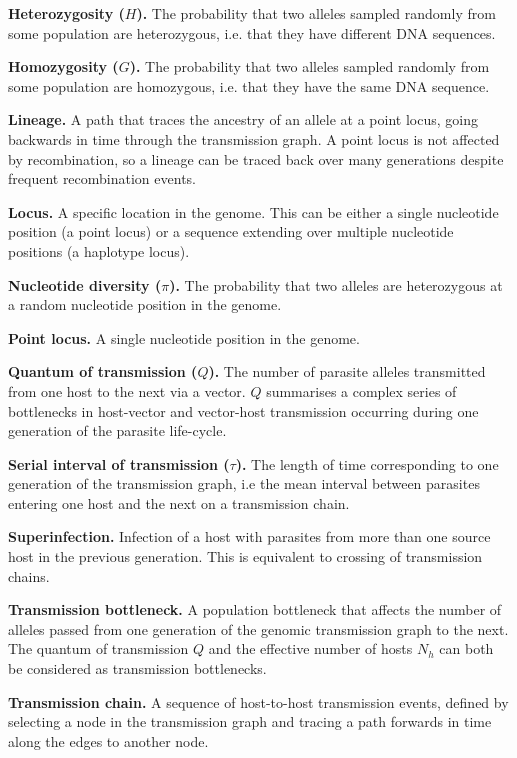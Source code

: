 \documentclass[_main.tex]{subfiles}
\begin{document}
{{\textbf{Heterozygosity ($H$).}  The probability that two alleles sampled randomly from some population are heterozygous, i.e. that they have different DNA sequences. 

\medskip

\textbf{Homozygosity ($G$).}  The probability that two alleles sampled randomly from some population are homozygous, i.e. that they have the same DNA sequence.

\medskip

\textbf{Lineage.} A path that traces the ancestry of an allele at a point locus, going backwards in time through the transmission graph.  A point locus is not affected by recombination, so a lineage can be traced back over many generations despite frequent recombination events.

\medskip

\textbf{Locus.}  A specific location in the genome.  This can be either a single nucleotide position (a point locus) or a sequence extending over multiple nucleotide positions (a haplotype locus).

\medskip

\textbf{Nucleotide diversity ($\pi$).}  The probability that two alleles are heterozygous at a random nucleotide position in the genome.

\medskip

\textbf{Point locus.}  A single nucleotide position in the genome. 

\medskip

\textbf{Quantum of transmission ($Q$).} The number of parasite alleles transmitted from one host to the next via a vector.  $Q$ summarises a complex series of bottlenecks in host-vector and vector-host transmission occurring during one generation of the parasite life-cycle.

\medskip

\textbf{Serial interval of transmission ($\tau$).}  The length of time corresponding to one generation of the transmission graph, i.e the mean interval between parasites entering one host and the next on a transmission chain.

\medskip

\textbf{Superinfection.}  Infection of a host with parasites from more than one source host in the previous generation.  This is equivalent to crossing of transmission chains.

\medskip

\textbf{Transmission bottleneck.}  A population bottleneck that affects the number of alleles passed from one generation of the genomic transmission graph to the next.  The quantum of transmission $Q$ and the effective number of hosts $N_h$ can both be considered as transmission bottlenecks.

\medskip

\textbf{Transmission chain.}  A sequence of host-to-host transmission events, defined by selecting a node in the transmission graph and tracing a path forwards in time along the edges to another node.


    }%
}
\end{document}
